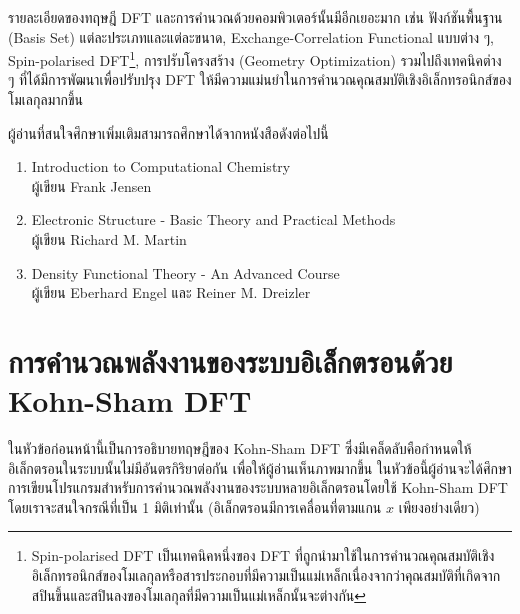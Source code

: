 รายละเอียดของทฤษฎี DFT และการคำนวณด้วยคอมพิวเตอร์นั้นมีอีกเยอะมาก เช่น ฟังก์ชันพื้นฐาน (Basis Set) แต่ละประเภทและแต่ละขนาด, Exchange-Correlation Functional แบบต่าง ๆ, Spin-polarised DFT\footnote{Spin-polarised DFT เป็นเทคนิคหนึ่งของ DFT ที่ถูกนำมาใช้ในการคำนวณคุณสมบัติเชิงอิเล็กทรอนิกส์ของโมเลกุลหรือสารประกอบที่มีความเป็นแม่เหล็กเนื่องจากว่าคุณสมบัติที่เกิดจากสปินขึ้นและสปินลงของโมเลกุลที่มีความเป็นแม่เหล็กนั้นจะต่างกัน}, การปรับโครงสร้าง (Geometry Optimization) รวมไปถึงเทคนิคต่าง ๆ ที่ได้มีการพัฒนาเพื่อปรับปรุง DFT ให้มีความแม่นยำในการคำนวณคุณสมบัติเชิงอิเล็กทรอนิกส์ของโมเลกุลมากขึ้น

ผู้อ่านที่สนใจศึกษาเพิ่มเติมสามารถศึกษาได้จากหนังสือดังต่อไปนี้
%
\begin{enumerate}[topsep=0pt,noitemsep]\setlength\itemsep{0.5em}
    \item Introduction to Computational Chemistry\autocite{jensen2017} \\
    ผู้เขียน Frank Jensen

    \item Electronic Structure - Basic Theory and Practical Methods\autocite{martin2020} \\
    ผู้เขียน Richard M. Martin

    \item Density Functional Theory - An Advanced Course\autocite{engel2011} \\
    ผู้เขียน Eberhard Engel และ Reiner M. Dreizler
\end{enumerate}

\section{การคำนวณพลังงานของระบบอิเล็กตรอนด้วย Kohn-Sham DFT}
\label{sec:calc_ener_kohn_sham}

ในหัวข้อก่อนหน้านี้เป็นการอธิบายทฤษฎีของ Kohn-Sham DFT ซึ่งมีเคล็ดลับคือกำหนดให้อิเล็กตรอนในระบบนั้นไม่มีอันตรกิริยาต่อกัน เพื่อให้ผู้อ่านเห็นภาพมากขึ้น ในหัวข้อนี้ผู้อ่านจะได้ศึกษาการเขียนโปรแกรมสำหรับการคำนวณพลังงานของระบบหลายอิเล็กตรอนโดยใช้ Kohn-Sham DFT โดยเราจะสนใจกรณีที่เป็น 1 มิติเท่านั้น (อิเล็กตรอนมีการเคลื่อนที่ตามแกน $x$ เพียงอย่างเดียว)

